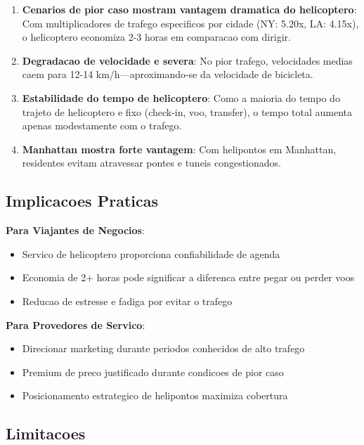 \documentclass[12pt,a4paper]{article}
\begin{document}
\begin{enumerate}
    \item \textbf{Cenarios de pior caso mostram vantagem dramatica do helicoptero}: Com multiplicadores de trafego especificos por cidade (NY: 5.20x, LA: 4.15x), o helicoptero economiza 2-3 horas em comparacao com dirigir.
    
    \item \textbf{Degradacao de velocidade e severa}: No pior trafego, velocidades medias caem para 12-14 km/h---aproximando-se da velocidade de bicicleta.
    
    \item \textbf{Estabilidade do tempo de helicoptero}: Como a maioria do tempo do trajeto de helicoptero e fixo (check-in, voo, transfer), o tempo total aumenta apenas modestamente com o trafego.
    
    \item \textbf{Manhattan mostra forte vantagem}: Com helipontos em Manhattan, residentes evitam atravessar pontes e tuneis congestionados.
\end{enumerate}

\subsection{Implicacoes Praticas}

\textbf{Para Viajantes de Negocios}:
\begin{itemize}
    \item Servico de helicoptero proporciona confiabilidade de agenda
    \item Economia de 2+ horas pode significar a diferenca entre pegar ou perder voos
    \item Reducao de estresse e fadiga por evitar o trafego
\end{itemize}

\textbf{Para Provedores de Servico}:
\begin{itemize}
    \item Direcionar marketing durante periodos conhecidos de alto trafego
    \item Premium de preco justificado durante condicoes de pior caso
    \item Posicionamento estrategico de helipontos maximiza cobertura
\end{itemize}

\subsection{Limitacoes}
\end{document}

